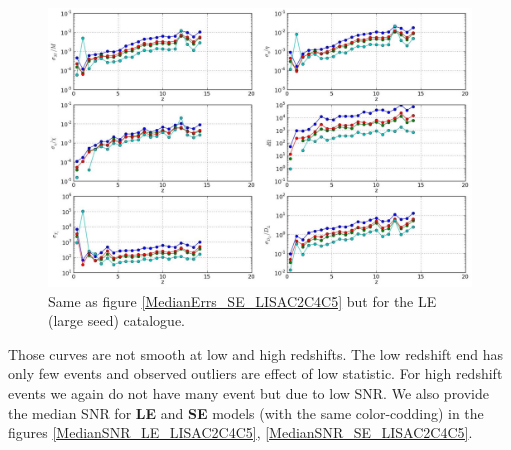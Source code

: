 \documentclass{iopart}
\begin{document}
\begin{figure}[H]
\center
   \includegraphics[width=1\textwidth]{FigSMBHPhenomAEI/MedianErrs_LE_LISAC2C4C5.eps}
\caption{Same as figure \ref{MedianErrs_SE_LISAC2C4C5} but for the LE (large seed) catalogue.
\label{MedianErrs_LE_LISAC2C4C5} } 
\end{figure}


Those curves are not smooth at low and high redshifts. The low redshift end has only few events and observed 
outliers are effect of low statistic.  For high redshift events we again do not have many event but due to low SNR. 
We also provide the median SNR for {\bf LE} and {\bf SE} models (with the same color-codding)  in the figures 
\ref{MedianSNR_LE_LISAC2C4C5}, \ref{MedianSNR_SE_LISAC2C4C5}.







 



\end{document}
